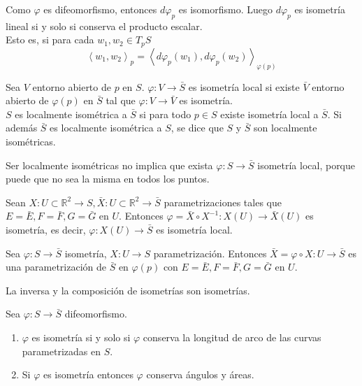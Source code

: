 \begin{remark}
    Como $\varphi$ es difeomorfismo, entonces $d\varphi_p$ es isomorfismo.
    Luego $d\varphi_p$ es isometría lineal si y solo si conserva el producto escalar.\\
    Esto es, si para cada $w_1, w_2 \in T_pS$
    $$\left\langle w_1, w_2 \right\rangle _p = \left\langle d\varphi_p(w_1), d\varphi_p(w_2) \right\rangle _{\varphi(p)}$$
\end{remark}

\begin{definition}
    Sea $V$ entorno abierto de $p$ en $S$.
    $\varphi : V \to \bar{S}$ es isometría local si existe $\bar{V}$ entorno abierto de $\varphi(p)$ en $\bar{S}$ tal que $\varphi : V \to \bar{V}$ es isometría.\\
    $S$ es localmente isométrica a $\bar{S}$ si para todo $p \in S$ existe isometría local a $\bar{S}$.
    Si además $\bar{S}$ es localmente isométrica a $S$, se dice que $S$ y $\bar{S}$ son localmente isométricas.
\end{definition}

\begin{remark}
    Ser localmente isométricas no implica que exista $\varphi : S \to \bar{S}$ isometría local, porque puede que no sea la misma en todos los puntos.
\end{remark}

\begin{proposition}
    Sean $X: U \subset \mathbb{R}^2 \to S, \bar{X}: U \subset \mathbb{R}^2 \to \bar{S}$ parametrizaciones tales que $E = \bar{E}, F = \bar{F}, G = \bar{G}$ en $U$.
    Entonces $\varphi = \bar{X} \circ X^{-1}: X(U) \to \bar{X}(U)$ es isometría, es decir, $\varphi: X(U) \to \bar{S}$ es isometría local.
\end{proposition}

\begin{proposition}
    Sea $\varphi: S \to \bar{S}$ isometría, $X: U \to S$ parametrización.
    Entonces $\bar{X} = \varphi \circ X: U \to \bar{S}$ es una parametrización de $\bar{S}$ en $\varphi(p)$ con $E = \bar{E}, F = \bar{F}, G = \bar{G}$ en $U$.
\end{proposition}

\begin{note}
    La inversa y la composición de isometrías son isometrías.
\end{note}

\begin{proposition}
    Sea $\varphi: S \to \bar{S}$ difeomorfismo.
    \begin{enumerate}
        \item $\varphi$ es isometría si y solo si $\varphi$ conserva la longitud de arco de las curvas parametrizadas en $S$.
        \item Si $\varphi$ es isometría entonces $\varphi$ conserva ángulos y áreas.
    \end{enumerate}
\end{proposition}

